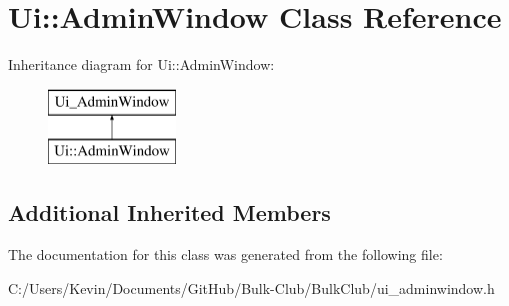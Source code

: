 \hypertarget{class_ui_1_1_admin_window}{}\section{Ui\+:\+:Admin\+Window Class Reference}
\label{class_ui_1_1_admin_window}
Inheritance diagram for Ui\+:\+:Admin\+Window\+:\begin{figure}[H]
\begin{center}
\leavevmode
\includegraphics[height=2.000000cm]{class_ui_1_1_admin_window}
\end{center}
\end{figure}
\subsection*{Additional Inherited Members}


The documentation for this class was generated from the following file\+:\begin{DoxyCompactItemize}
\item 
C\+:/\+Users/\+Kevin/\+Documents/\+Git\+Hub/\+Bulk-\/\+Club/\+Bulk\+Club/ui\+\_\+adminwindow.\+h\end{DoxyCompactItemize}
